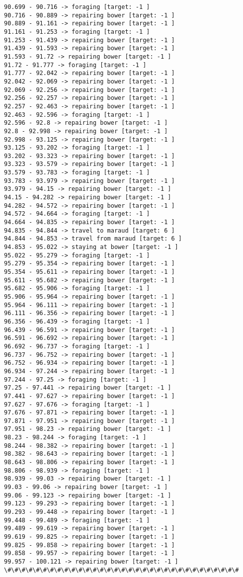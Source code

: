 \documentclass[11pt]{article}
\begin{document}
\begin{Verbatim}[commandchars=\\\{\}]
90.699 - 90.716 -> foraging [target: -1 ]
90.716 - 90.889 -> repairing bower [target: -1 ]
90.889 - 91.161 -> repairing bower [target: -1 ]
91.161 - 91.253 -> foraging [target: -1 ]
91.253 - 91.439 -> repairing bower [target: -1 ]
91.439 - 91.593 -> repairing bower [target: -1 ]
91.593 - 91.72 -> repairing bower [target: -1 ]
91.72 - 91.777 -> foraging [target: -1 ]
91.777 - 92.042 -> repairing bower [target: -1 ]
92.042 - 92.069 -> repairing bower [target: -1 ]
92.069 - 92.256 -> repairing bower [target: -1 ]
92.256 - 92.257 -> repairing bower [target: -1 ]
92.257 - 92.463 -> repairing bower [target: -1 ]
92.463 - 92.596 -> foraging [target: -1 ]
92.596 - 92.8 -> repairing bower [target: -1 ]
92.8 - 92.998 -> repairing bower [target: -1 ]
92.998 - 93.125 -> repairing bower [target: -1 ]
93.125 - 93.202 -> foraging [target: -1 ]
93.202 - 93.323 -> repairing bower [target: -1 ]
93.323 - 93.579 -> repairing bower [target: -1 ]
93.579 - 93.783 -> foraging [target: -1 ]
93.783 - 93.979 -> repairing bower [target: -1 ]
93.979 - 94.15 -> repairing bower [target: -1 ]
94.15 - 94.282 -> repairing bower [target: -1 ]
94.282 - 94.572 -> repairing bower [target: -1 ]
94.572 - 94.664 -> foraging [target: -1 ]
94.664 - 94.835 -> repairing bower [target: -1 ]
94.835 - 94.844 -> travel to maraud [target: 6 ]
94.844 - 94.853 -> travel from maraud [target: 6 ]
94.853 - 95.022 -> staying at bower [target: -1 ]
95.022 - 95.279 -> foraging [target: -1 ]
95.279 - 95.354 -> repairing bower [target: -1 ]
95.354 - 95.611 -> repairing bower [target: -1 ]
95.611 - 95.682 -> repairing bower [target: -1 ]
95.682 - 95.906 -> foraging [target: -1 ]
95.906 - 95.964 -> repairing bower [target: -1 ]
95.964 - 96.111 -> repairing bower [target: -1 ]
96.111 - 96.356 -> repairing bower [target: -1 ]
96.356 - 96.439 -> foraging [target: -1 ]
96.439 - 96.591 -> repairing bower [target: -1 ]
96.591 - 96.692 -> repairing bower [target: -1 ]
96.692 - 96.737 -> foraging [target: -1 ]
96.737 - 96.752 -> repairing bower [target: -1 ]
96.752 - 96.934 -> repairing bower [target: -1 ]
96.934 - 97.244 -> repairing bower [target: -1 ]
97.244 - 97.25 -> foraging [target: -1 ]
97.25 - 97.441 -> repairing bower [target: -1 ]
97.441 - 97.627 -> repairing bower [target: -1 ]
97.627 - 97.676 -> foraging [target: -1 ]
97.676 - 97.871 -> repairing bower [target: -1 ]
97.871 - 97.951 -> repairing bower [target: -1 ]
97.951 - 98.23 -> repairing bower [target: -1 ]
98.23 - 98.244 -> foraging [target: -1 ]
98.244 - 98.382 -> repairing bower [target: -1 ]
98.382 - 98.643 -> repairing bower [target: -1 ]
98.643 - 98.806 -> repairing bower [target: -1 ]
98.806 - 98.939 -> foraging [target: -1 ]
98.939 - 99.03 -> repairing bower [target: -1 ]
99.03 - 99.06 -> repairing bower [target: -1 ]
99.06 - 99.123 -> repairing bower [target: -1 ]
99.123 - 99.293 -> repairing bower [target: -1 ]
99.293 - 99.448 -> repairing bower [target: -1 ]
99.448 - 99.489 -> foraging [target: -1 ]
99.489 - 99.619 -> repairing bower [target: -1 ]
99.619 - 99.825 -> repairing bower [target: -1 ]
99.825 - 99.858 -> repairing bower [target: -1 ]
99.858 - 99.957 -> repairing bower [target: -1 ]
99.957 - 100.121 -> repairing bower [target: -1 ]
\#\#\#\#\#\#\#\#\#\#\#\#\#\#\#\#\#\#\#\#\#\#\#\#\#\#\#\#\#\#\#\#\#



\end{Verbatim}
\end{document}
